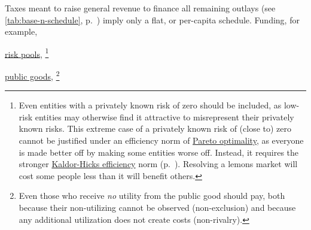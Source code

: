 \begin{description}
	Taxes meant to raise general revenue to finance all remaining outlays (see \autoref{tab:base-n-schedule}, p.~\pageref{tab:base-n-schedule}) imply only a flat, or per-capita schedule.
	Funding, for example,
	\begin{inparaenum}
		\item \hyperref[sec:adverse-selection]{risk pools},
		\footnote{
			Even entities with a privately known risk of zero should be included, as low-risk entities may otherwise find it attractive to misrepresent their privately known risks.
			This extreme case of a privately known risk of (close to) zero cannot be justified under an efficiency norm of \hyperref[sec:Pareto]{Pareto optimality}, as everyone is made better off by making some entities worse off.
			Instead, it requires the stronger \hyperref[sec:KaldorHicks]{Kaldor-Hicks efficiency} norm (p.~\pageref{sec:Efficiency})\citep{Kaldor1939,Hicks1939}.
			Resolving a lemons market will cost some people less than it will benefit others.
		}
		\item \hyperref[sec:public-good]{public goods},
		\footnote{
			Even those who receive \emph{no} utility from the public good should pay, both because their non-utilizing cannot be observed (non-exclusion) and because any additional utilization does not create costs (non-rivalry).
}
\end{inparaenum}
\end{description}
